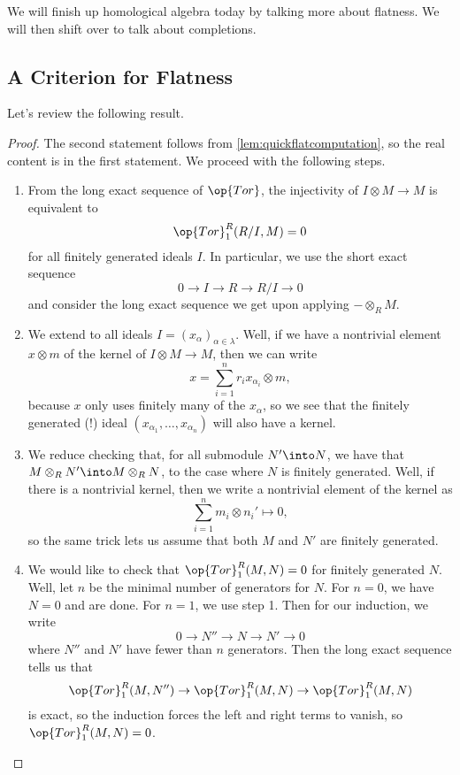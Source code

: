 
We will finish up homological algebra today by talking more about flatness. We will then shift over to talk about completions.

\subsection{A Criterion for Flatness}
Let's review the following result.
\flatcondition*
\begin{proof}
	The second statement follows from \autoref{lem:quickflatcomputation}, so the real content is in the first statement. We proceed with the following steps.
	\begin{enumerate}
		\item From the long exact sequence of $\op{Tor}$, the injectivity of $I\otimes M\to M$ is equivalent to
		\[\op{Tor}_1^R(R/I,M)=0\]
		for all finitely generated ideals $I$. In particular, we use the short exact sequence
		\[0\to I\to R\to R/I\to 0\]
		and consider the long exact sequence we get upon applying $-\otimes_RM$.
		\item We extend to all ideals $I=(x_\alpha)_{\alpha\in\lambda}$. Well, if we have a nontrivial element $x\otimes m$ of the kernel of $I\otimes M\to M$, then we can write
		\[x=\sum_{i=1}^nr_ix_{\alpha_i}\otimes m,\]
		because $x$ only uses finitely many of the $x_\alpha$, so we see that the finitely generated (!) ideal $(x_{\alpha_1},\ldots,x_{\alpha_n})$ will also have a kernel.
		\item We reduce checking that, for all submodule $N'\into N$, we have that $M\otimes_RN'\into M\otimes_RN$, to the case where $N$ is finitely generated. Well, if there is a nontrivial kernel, then we write a nontrivial element of the kernel as
		\[\sum_{i=1}^nm_i\otimes n_i'\mapsto0,\]
		so the same trick lets us assume that both $M$ and $N'$ are finitely generated.

		\item We would like to check that $\op{Tor}_1^R(M,N)=0$ for finitely generated $N$. Well, let $n$ be the minimal number of generators for $N$. For $n=0$, we have $N=0$ and are done. For $n=1$, we use step 1. Then for our induction, we write
		\[0\to N''\to N\to N'\to0\]
		where $N''$ and $N'$ have fewer than $n$ generators. Then the long exact sequence tells us that
		\[\op{Tor}_1^R(M,N'')\to\op{Tor}_1^R(M,N)\to\op{Tor}_1^R(M,N)\]
		is exact, so the induction forces the left and right terms to vanish, so $\op{Tor}_1^R(M,N)=0$.
		\qedhere
	\end{enumerate}
\end{proof}
